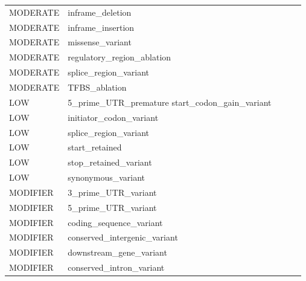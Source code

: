 \begin{table}[]
{\begin{tabular}{|l|l|lll}
MODERATE                       & inframe\_deletion                                    &  &  &  \\ \cline{1-2}
MODERATE                       & inframe\_insertion                                   &  &  &  \\ \cline{1-2}
MODERATE                       & missense\_variant                                    &  &  &  \\ \cline{1-2}
MODERATE                       & regulatory\_region\_ablation                         &  &  &  \\ \cline{1-2}
MODERATE                       & splice\_region\_variant                              &  &  &  \\ \cline{1-2}
MODERATE                       & TFBS\_ablation                                       &  &  &  \\ \cline{1-2}
LOW                            & 5\_prime\_UTR\_premature start\_codon\_gain\_variant &  &  &  \\ \cline{1-2}
LOW                            & initiator\_codon\_variant                            &  &  &  \\ \cline{1-2}
LOW                            & splice\_region\_variant                              &  &  &  \\ \cline{1-2}
LOW                            & start\_retained                                      &  &  &  \\ \cline{1-2}
LOW                            & stop\_retained\_variant                              &  &  &  \\ \cline{1-2}
LOW                            & synonymous\_variant                                  &  &  &  \\ \cline{1-2}
MODIFIER                       & 3\_prime\_UTR\_variant                               &  &  &  \\ \cline{1-2}
MODIFIER                       & 5\_prime\_UTR\_variant                               &  &  &  \\ \cline{1-2}
MODIFIER                       & coding\_sequence\_variant                            &  &  &  \\ \cline{1-2}
MODIFIER                       & conserved\_intergenic\_variant                       &  &  &  \\ \cline{1-2}
MODIFIER                       & downstream\_gene\_variant                            &  &  &  \\ \cline{1-2}
MODIFIER                       & conserved\_intron\_variant                           &  &  &  \\ \cline{1-2}

\end{tabular}}
\end{table}
